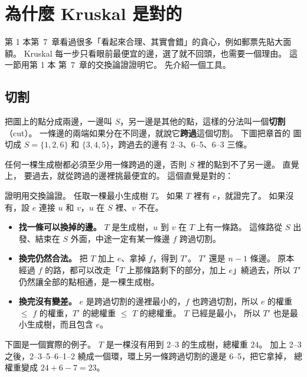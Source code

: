 \section{為什麼 Kruskal 是對的}
\label{sec:mst-cut}

第 1 本第~7~章看過很多「看起來合理、其實會錯」的貪心，例如郵票先貼大面額。
Kruskal 每一步只看眼前最便宜的邊，選了就不回頭，也需要一個理由。 這一節用第 1 本
第~7~章的交換論證證明它。 先介紹一個工具。

\subsection{切割}

把圖上的點分成兩邊，一邊叫 $S$，另一邊是其他的點，這樣的分法叫一個\textbf{切割}
（cut）。 一條邊的兩端如果分在不同邊，就說它\textbf{跨過}這個切割。 下圖把章首的
圖切成 $S = \{1, 2, 6\}$ 和 $\{3, 4, 5\}$，跨過去的邊有 2--3、6--5、6--3 三條。

任何一棵生成樹都必須至少用一條跨過的邊，否則 $S$ 裡的點到不了另一邊。 直覺上，
要過去，就從跨過的邊裡挑最便宜的。 這個直覺是對的：

\begin{center}
\end{center}

證明用交換論證。 任取一棵最小生成樹 $T$。 如果 $T$ 裡有 $e$，就證完了。 如果沒
有，設 $e$ 連接 $u$ 和 $v$，$u$ 在 $S$ 裡、$v$ 不在。

\begin{itemize}
\item \textbf{找一條可以換掉的邊。} $T$ 是生成樹，$u$ 到 $v$ 在 $T$ 上有一條路。
這條路從 $S$ 出發、結束在 $S$ 外面，中途一定有某一條邊 $f$ 跨過切割。
\item \textbf{換完仍然合法。} 把 $T$ 加上 $e$、拿掉 $f$，得到 $T'$。 $T'$ 還是
$n - 1$ 條邊。 原本經過 $f$ 的路，都可以改走「$T$ 上那條路剩下的部分，加上
$e$」繞過去，所以 $T'$ 仍然讓全部的點相通，是一棵生成樹。
\item \textbf{換完沒有變差。} $e$ 是跨過切割的邊裡最小的，$f$ 也跨過切割，所以
$e$ 的權重 $\le$ $f$ 的權重，$T'$ 的總權重 $\le$ $T$ 的總權重。 $T$ 已經是最小，
所以 $T'$ 也是最小生成樹，而且包含 $e$。
\end{itemize}

下圖是一個實際的例子。 $T$ 是一棵沒有用到 2--3 的生成樹，總權重 $24$。 加上
2--3 之後，2--3--5--6--1--2 繞成一個環，環上另一條跨過切割的邊是 6--5，把它拿掉，
總權重變成 $24 + 6 - 7 = 23$。


